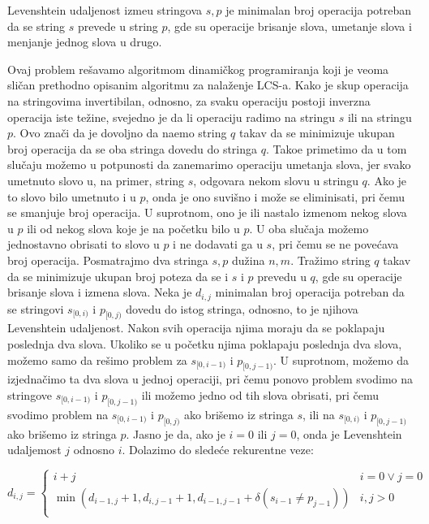 \noindent
\begin{minipage}[l]{\textwidth}
\begin{dfn}
Levenshtein udaljenost izme\dj u stringova $s,p$ je minimalan broj operacija potreban da se string $s$ prevede u string $p$, gde su operacije brisanje slova, umetanje slova i menjanje jednog slova u drugo.
\end{dfn}
\end{minipage}

Ovaj problem re\v savamo algoritmom dinami\v ckog programiranja koji je veoma sli\v can prethodno opisanim algoritmu za nala\v zenje LCS-a. Kako je skup operacija na stringovima invertibilan, odnosno, za svaku operaciju postoji inverzna operacija iste te\v zine, svejedno je da li operaciju radimo na stringu $s$ ili na stringu $p$. Ovo zna\v ci da je dovoljno da na\dj emo string $q$ takav da se minimizuje ukupan broj operacija da se oba stringa dovedu do stringa $q$. Tako\dj e primetimo da u tom slu\v caju mo\v zemo u potpunosti da zanemarimo operaciju umetanja slova, jer svako umetnuto slovo u, na primer, string $s$, odgovara nekom slovu u stringu $q$. Ako je to slovo bilo umetnuto i u $p$, onda je ono suvi\v sno i mo\v ze se eliminisati, pri \v cemu se smanjuje broj operacija. U suprotnom, ono je ili nastalo izmenom nekog slova u $p$ ili od nekog slova koje je na po\v cetku bilo u $p$. U oba slu\v caja mo\v zemo jednostavno obrisati to slovo u $p$ i ne dodavati ga u $s$, pri \v cemu se ne pove\' cava broj operacija. Posmatrajmo dva stringa $s,p$ du\v zina $n,m$. Tra\v zimo string $q$ takav da se minimizuje ukupan broj poteza da se i $s$ i $p$ prevedu u $q$, gde su operacije brisanje slova i izmena slova. Neka je $d_{i,j}$ minimalan broj operacija potreban da se stringovi $s_{[0,i)}$ i $p_{[0,j)}$ dovedu do istog stringa, odnosno, to je njihova Levenshtein udaljenost. Nakon svih operacija njima moraju da se poklapaju poslednja dva slova. Ukoliko se u po\v cetku njima poklapaju poslednja dva slova, mo\v zemo samo da re\v simo problem za $s_{[0,i-1)}$ i $p_{[0,j-1)}$. U suprotnom, mo\v zemo da izjedna\v cimo ta dva slova u jednoj operaciji, pri \v cemu ponovo problem svodimo na stringove $s_{[0,i-1)}$ i $p_{[0,j-1)}$ ili mo\v zemo jedno od tih slova obrisati, pri \v cemu svodimo problem na $s_{[0,i-1)}$ i $p_{[0,j)}$ ako bri\v semo iz stringa $s$, ili na $s_{[0,i)}$ i $p_{[0,j-1)}$ ako bri\v semo iz stringa $p$. Jasno je da, ako je $i=0$ ili $j=0$, onda je Levenshtein udaljemost $j$ odnosno $i$. Dolazimo do slede\' ce rekurentne veze:

\begin{equation}
    d_{i,j} = \begin{cases}
        i+j & i=0 \vee j=0 \\
        \min(d_{i-1,j}+1, d_{i,j-1}+1, d_{i-1,j-1}+\delta(s_{i-1} \not = p_{j-1})) & i,j > 0 \\
    \end{cases}
\end{equation}

